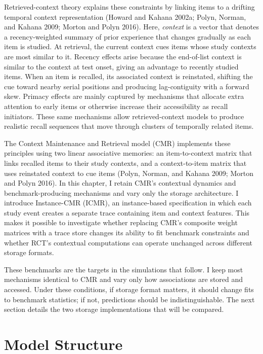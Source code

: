 \documentclass[
  letterpaper,
  11pt,
  english,
  singlespacing,
  headsepline]{MastersDoctoralThesis}
\begin{document}
Retrieved-context theory explains these constraints by linking items to
a drifting temporal context representation (Howard and Kahana 2002a;
Polyn, Norman, and Kahana 2009; Morton and Polyn 2016). Here,
\emph{context} is a vector that denotes a recency-weighted summary of
prior experience that changes gradually as each item is studied. At
retrieval, the current context cues items whose study contexts are most
similar to it. Recency effects arise because the end-of-list context is
similar to the context at test onset, giving an advantage to recently
studied items. When an item is recalled, its associated context is
reinstated, shifting the cue toward nearby serial positions and
producing lag-contiguity with a forward skew. Primacy effects are mainly
captured by mechanisms that allocate extra attention to early items or
otherwise increase their accessibility as recall initiators. These same
mechanisms allow retrieved-context models to produce realistic recall
sequences that move through clusters of temporally related items.

The Context Maintenance and Retrieval model (CMR) implements these
principles using two linear associative memories: an item-to-context
matrix that links recalled items to their study contexts, and a
context-to-item matrix that uses reinstated context to cue items (Polyn,
Norman, and Kahana 2009; Morton and Polyn 2016). In this chapter, I
retain CMR's contextual dynamics and benchmark-producing mechanisms and
vary only the storage architecture. I introduce Instance-CMR (ICMR), an
instance-based specification in which each study event creates a
separate trace containing item and context features. This makes it
possible to investigate whether replacing CMR's composite weight
matrices with a trace store changes its ability to fit benchmark
constraints and whether RCT's contextual computations can operate
unchanged across different storage formats.

These benchmarks are the targets in the simulations that follow. I keep
most mechanisms identical to CMR and vary only how associations are
stored and accessed. Under these conditions, if storage format matters,
it should change fits to benchmark statistics; if not, predictions
should be indistinguishable. The next section details the two storage
implementations that will be compared.

\section{Model Structure}\label{model-structure}
\end{document}
